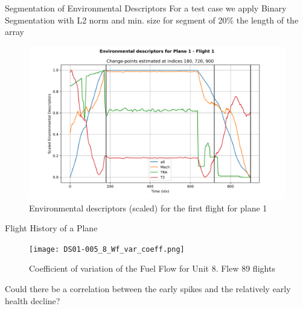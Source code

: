 \documentclass{beamer}
\begin{document}
        \begin{frame}{Segmentation of Environmental Descriptors}
            For a test case we apply Binary Segmentation with L2 norm and min. size for segment of 20\% the length of the array
            \begin{figure}
                \centering
                \includegraphics[scale=0.35]{environment_split_1_1.png}
                \caption{Environmental descriptors (scaled) for the first flight for plane 1}
            \end{figure}
        \end{frame}

        \begin{frame}{Flight History of a Plane}
            \begin{figure}
                \centering
                \texttt{[image: DS01-005\_8\_Wf\_var\_coeff.png]}
                \caption{Coefficient of variation of the Fuel Flow for Unit 8. Flew 89 flights}
            \end{figure}
            Could there be a correlation between the early spikes and the relatively early health decline?
        \end{frame}
\end{document}
